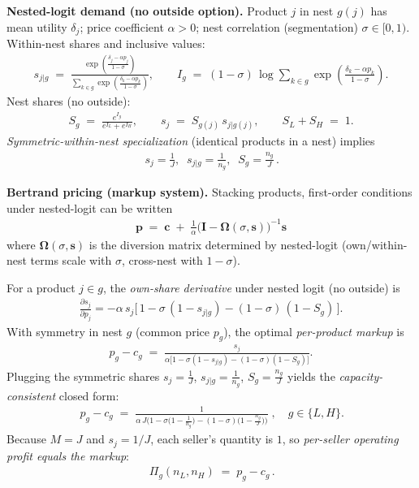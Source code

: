 \documentclass{article}
\begin{document}
\medskip
\textbf{Nested-logit demand (no outside option).}
Product $j$ in nest $g(j)$ has mean utility $\delta_j$; price coefficient $\alpha>0$; nest correlation (segmentation) $\sigma\in[0,1)$.
Within-nest shares and inclusive values:
\begin{align*}
s_{j|g} \;=\;
\frac{\exp\!\left(\frac{\delta_j-\alpha p_j}{1-\sigma}\right)}
{\sum_{k\in g}\exp\!\left(\frac{\delta_k-\alpha p_k}{1-\sigma}\right)},
\qquad
I_g \;=\; (1-\sigma)\,\log\!\sum_{k\in g}\exp\!\left(\frac{\delta_k-\alpha p_k}{1-\sigma}\right).
\end{align*}
Nest shares (no outside):
\begin{align*}
S_g \;=\;\frac{e^{I_g}}{e^{I_L}+e^{I_H}},
\qquad
s_j \;=\; S_{g(j)}\,s_{j|g(j)},
\qquad
S_L+S_H \;=\; 1.
\end{align*}
\emph{Symmetric-within-nest specialization} (identical products in a nest) implies
\begin{align*}
\boxed{\,s_j=\tfrac{1}{J},\;\; s_{j|g}=\tfrac{1}{n_g},\;\; S_g=\tfrac{n_g}{J}\,}.
\end{align*}

\medskip
\textbf{Bertrand pricing (markup system).}
Stacking products, first-order conditions under nested-logit can be written
\begin{align*}
\boxed{\; \mathbf p \;=\; \mathbf c \;+\; \frac{1}{\alpha}\big(\mathbf I-\mathbf\Omega(\sigma,\mathbf s)\big)^{-1}\mathbf s \;}
\end{align*}
where $\mathbf\Omega(\sigma,\mathbf s)$ is the diversion matrix determined by nested-logit (own/within-nest terms scale with $\sigma$, cross-nest with $1-\sigma$).

For a product $j\in g$, the \emph{own-share derivative} under nested logit (no outside) is
\begin{align*}
\frac{\partial s_j}{\partial p_j}
= -\alpha\, s_j\Big[\,1 - \sigma\,(1 - s_{j|g}) - (1-\sigma)\,(1 - S_g)\,\Big].
\end{align*}
With symmetry in nest $g$ (common price $p_g$), the optimal \emph{per-product markup} is
\begin{align*}
p_g - c_g \;=\; \frac{s_j}{\alpha\big[1 - \sigma(1-s_{j|g}) - (1-\sigma)(1-S_g)\big]}.
\end{align*}
Plugging the symmetric shares $s_j=\tfrac{1}{J}$, $s_{j|g}=\tfrac{1}{n_g}$, $S_g=\tfrac{n_g}{J}$ yields the \emph{capacity-consistent} closed form:
\begin{align*}
\boxed{
\,p_g - c_g
\;=\;
\frac{1}{\alpha\,J\Big(1 - \sigma\!\big(1-\tfrac{1}{n_g}\big) - (1-\sigma)\!\big(1-\tfrac{n_g}{J}\big)\Big)}\;,\quad g\in\{L,H\}.
}
\end{align*}
Because $M=J$ and $s_j=1/J$, each seller’s quantity is $1$, so \emph{per-seller operating profit equals the markup}:
\begin{align*}
\boxed{\,\Pi_g(n_L,n_H) \;=\; p_g - c_g\,}.
\end{align*}
\end{document}
